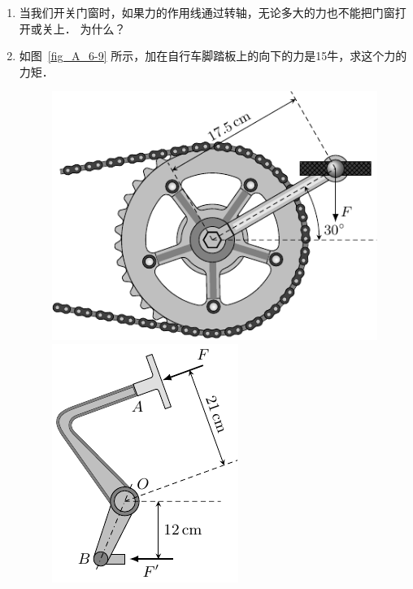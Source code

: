 \begin{enumerate}
    \item 当我们开关门窗时，如果力的作用线通过转轴，无论多大的力也不能把门窗打开或关上．
    为什么？
    \item 如图~\ref{fig_A_6-9} 所示，加在自行车脚踏板上的向下的力是15牛，求这个力的力矩．
    
   \begin{figure}[htbp]
        \centering
        \begin{minipage}[t]{0.48\textwidth}
            \centering
            \includegraphics{fig/A/6-9.pdf}
            \caption{}\label{fig_A_6-9}
        \end{minipage}
        \begin{minipage}[t]{0.48\textwidth}
            \centering
            \includegraphics{fig/A/6-10.pdf}
            \caption{}\label{fig_A_6-10}
        \end{minipage}
   \end{figure}


\end{enumerate}
